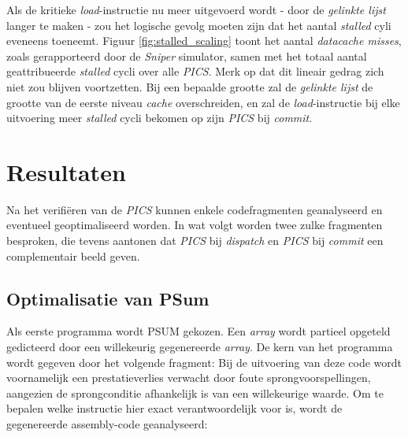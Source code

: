 \documentclass[12pt,a4paper,faculty=ea,language=nl]{ugent-doc}
\begin{document}
Als de kritieke \textit{load}-instructie nu meer uitgevoerd wordt - door de \textit{gelinkte lijst} langer te maken - zou het logische gevolg moeten zijn dat het aantal \textit{stalled} cyli eveneens toeneemt. Figuur \ref{fig:stalled_scaling} toont het aantal \textit{datacache misses}, zoals gerapporteerd door de \textit{Sniper} simulator, samen met het totaal aantal geattribueerde \textit{stalled} cycli over alle \textit{PICS}. Merk op dat dit lineair gedrag zich niet zou blijven voortzetten. Bij een bepaalde grootte zal de \textit{gelinkte lijst} de grootte van de eerste niveau \textit{cache} overschreiden, en zal de \textit{load}-instructie bij elke uitvoering meer \textit{stalled} cycli bekomen op zijn \textit{PICS} bij \textit{commit}.

\section{Resultaten}
\label{sectie:resultaten}
Na het verifiëren van de \textit{PICS} kunnen enkele codefragmenten geanalyseerd en eventueel geoptimaliseerd worden. In wat volgt worden twee zulke fragmenten besproken, die tevens aantonen dat \textit{PICS} bij \textit{dispatch} en \textit{PICS} bij \textit{commit} een complementair beeld geven.

\subsection{Optimalisatie van PSum}
\label{dispatch}
Als eerste programma wordt PSUM gekozen. Een \textit{array} wordt partieel opgeteld gedicteerd door een willekeurig gegenereerde \textit{array}. De kern van het programma wordt gegeven door het volgende fragment:
Bij de uitvoering van deze code wordt voornamelijk een prestatieverlies verwacht door foute sprongvoorspellingen, aangezien de sprongconditie afhankelijk is van een willekeurige waarde. Om te bepalen welke instructie hier exact verantwoordelijk voor is, wordt de gegenereerde assembly-code geanalyseerd:
\end{document}
